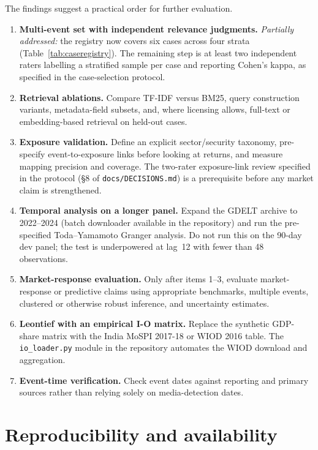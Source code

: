 \documentclass[10pt,a4paper,twocolumn]{article}
\begin{document}
The findings suggest a practical order for further evaluation.
\begin{enumerate}
  \item \textbf{Multi-event set with independent relevance judgments.} \textit{Partially addressed:} the registry now covers six cases across four strata (Table~\ref{tab:caseregistry}). The remaining step is at least two independent raters labelling a stratified sample per case and reporting Cohen's kappa, as specified in the case-selection protocol.
  \item \textbf{Retrieval ablations.} Compare TF-IDF versus BM25, query construction variants, metadata-field subsets, and, where licensing allows, full-text or embedding-based retrieval on held-out cases.
  \item \textbf{Exposure validation.} Define an explicit sector/security taxonomy, pre-specify event-to-exposure links before looking at returns, and measure mapping precision and coverage. The two-rater exposure-link review specified in the protocol (§8 of \texttt{docs/DECISIONS.md}) is a prerequisite before any market claim is strengthened.
  \item \textbf{Temporal analysis on a longer panel.} Expand the GDELT archive to 2022--2024 (batch downloader available in the repository) and run the pre-specified Toda--Yamamoto Granger analysis. Do not run this on the 90-day dev panel; the test is underpowered at lag~12 with fewer than 48 observations.
  \item \textbf{Market-response evaluation.} Only after items 1--3, evaluate market-response or predictive claims using appropriate benchmarks, multiple events, clustered or otherwise robust inference, and uncertainty estimates.
  \item \textbf{Leontief with an empirical I-O matrix.} Replace the synthetic GDP-share matrix with the India MoSPI 2017-18 or WIOD 2016 table. The \texttt{io\_loader.py} module in the repository automates the WIOD download and aggregation.
  \item \textbf{Event-time verification.} Check event dates against reporting and primary sources rather than relying solely on media-detection dates.
\end{enumerate}

\section{Reproducibility and availability}\label{sec:repro}
\end{document}
